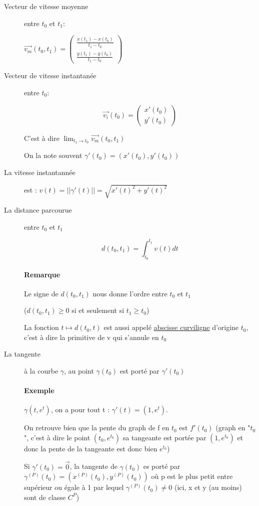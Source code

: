 \begin{description}
	\item[Vecteur de vitesse moyenne] entre $t_0$ et $t_1$:

	$\overrightarrow{v_m}(t_0, t_1) = \begin{pmatrix}
				\frac{x(t_1) - x(t_0)}{t_1 - t_0} \\
				\frac{y(t_1) - y(t_0)}{t_1 - t_0} \end{pmatrix}$

	\item[Vecteur de vitesse instantanée] entre $t_0$:

	\[\overrightarrow{v_i}(t_0) = \begin{pmatrix}
				x'(t_0) \\
				y'(t_0)\end{pmatrix}\]

C'est à dire $\lim_{t_1 \to t_0} \vec{v_m}(t_0, t_1)$

On la note souvent $\gamma'(t_0) = (x'(t_0), y'(t_0))$

	\item[La vitesse instantannée] est :
		$v(t) = ||\gamma'(t)|| = \sqrt{x'(t)^2 + y'(t)^2}$
	
	\item[La distance parcourue] entre $t_0$ et $t_1$

		\[d(t_0, t_1) = \int_{t_0}^{t_1} v(t)dt\]

	\paragraph{Remarque} Le signe de $d(t_0, t_1)$ nous donne l'ordre entre $t_0$ et $t_1$

	($d(t_0, t_1) \geq 0$ si et seulement si $t_1 \geq t_0$)


	La fonction $t \mapsto d(t_0, t)$ est aussi appelé \ul{abscisse curviligne} d'origine $t_0$, c'est à dire la primitive de v qui s'annule en $t_0$

\item[La tangente] à la courbe $\gamma$, au point $\gamma(t_0)$ est porté par $\gamma'(t_0)$

	\paragraph{Exemple} $\gamma(t, e^t)$, on a pour tout t : $\gamma'(t) = (1, e^t)$.

	On retrouve bien que la pente du graph de f en $t_0$ est $f'(t_0)$ (graph en "$t_0$", c'est à dire le point $(t_0, e^{t_0})$ sa tangeante  est portée par $(1, e^{t_0})$ et donc la pente de la tangeante est donc bien $e^{t_0}$)

	Si $\gamma'(t_0) = \vec{0}$, la tangente de $\gamma(t_0)$ es porté par $\gamma^{(P)}(t_0) = (x^{(P)}(t_0), y^{(P)}(t_0))$ où p est le plus petit entre supérieur ou égale à 1 par lequel $\gamma^{(P)}(t_0) \neq 0$ (ici, x et y (au moins) sont de classe $C^P$)
\end{description}

